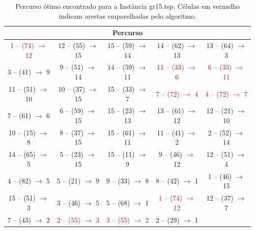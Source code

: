 \begin{table}[H]
    \centering
    \scriptsize
    \begin{tabular}{|c|c|c|c|c|}
        \hline
        \multicolumn{5}{|c|}{Percurso} \\ \hline
    \textcolor{red}{1 -- (74) $\rightarrow$ 12} & 12 -- (55) $\rightarrow$ 15 & 15 -- (59) $\rightarrow$ 14 & 14 -- (62) $\rightarrow$ 13 & 13 -- (64) $\rightarrow$ 3 \\
    3 -- (41) $\rightarrow$ 9 & 9 -- (51) $\rightarrow$ 14 & 14 -- (59) $\rightarrow$ 11 & \textcolor{red}{11 -- (33) $\rightarrow$ 6} & \textcolor{red}{6 -- (33) $\rightarrow$ 11} \\
    11 -- (51) $\rightarrow$ 10 & 10 -- (37) $\rightarrow$ 15 & 15 -- (33) $\rightarrow$ 7 & \textcolor{red}{7 -- (72) $\rightarrow$ 4} & \textcolor{red}{4 -- (72) $\rightarrow$ 7} \\
    7 -- (61) $\rightarrow$ 6 & 6 -- (59) $\rightarrow$ 15 & 15 -- (23) $\rightarrow$ 13 & 13 -- (61) $\rightarrow$ 12 & 12 -- (21) $\rightarrow$ 10 \\
    10 -- (15) $\rightarrow$ 8 & 8 -- (37) $\rightarrow$ 15 & 15 -- (61) $\rightarrow$ 11 & 11 -- (41) $\rightarrow$ 2 & 2 -- (52) $\rightarrow$ 14 \\
    14 -- (65) $\rightarrow$ 5 & 5 -- (23) $\rightarrow$ 15 & 15 -- (11) $\rightarrow$ 9 & 9 -- (46) $\rightarrow$ 12 & 12 -- (51) $\rightarrow$ 4 \\
    4 -- (82) $\rightarrow$ 5 & 5 -- (21) $\rightarrow$ 9 & 9 -- (33) $\rightarrow$ 8 & 8 -- (42) $\rightarrow$ 1 & 1 -- (46) $\rightarrow$ 15 \\
    15 -- (51) $\rightarrow$ 3 & 3 -- (46) $\rightarrow$ 5 & 5 -- (68) $\rightarrow$ 1 & \textcolor{red}{1 -- (74) $\rightarrow$ 12} & 12 -- (37) $\rightarrow$ 7 \\
    7 -- (43) $\rightarrow$ 2 & \textcolor{red}{2 -- (55) $\rightarrow$ 3} & \textcolor{red}{3 -- (55) $\rightarrow$ 2} & 2 -- (29) $\rightarrow$ 1 &   \\
        \hline
    \end{tabular}
    \caption{Percurso ótimo encontrado para a Instância gr15.tsp. Células em vermelho indicam arestas emparelhadas pelo algoritmo.}
    \label{tab:percurso_gr15}
\end{table}
